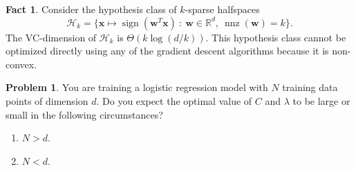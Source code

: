 \documentclass[10pt]{exam}
\theoremstyle{definition}
\newtheorem{problem}{Problem}
\newtheorem{fact}{Fact}
\newcommand{\R}{\mathbb R}
\DeclareMathOperator{\nnz}{nnz}
\DeclareMathOperator{\sign}{sign}
\newcommand{\trans}[1]{{#1}^{T}}
\newcommand{\w}{\mathbf w}
\newcommand{\x}{\mathbf x}
\begin{document}
\vspace{0.2in}
\begin{fact}
    Consider the hypothesis class of $k$-sparse halfspaces
    \begin{equation}
        \mathcal{H}_k = \bigg\{ \x \mapsto \sign(\trans\w\x) ~:~ \w\in\R^d,~\nnz(\w)=k \bigg\}
        .
    \end{equation}
    The VC-dimension of $\mathcal{H}_k$ is $\Theta(k\log (d/k))$.
    This hypothesis class cannot be optimized directly using any of the gradient descent algorithms because it is non-convex.
\end{fact}

\newpage
\begin{problem}
    You are training a logistic regression model with $N$ training data points of dimension $d$.
    Do you expect the optimal value of $C$ and $\lambda$ to be large or small in the following circumstances?
    \begin{enumerate}
        \item $N > d$.
            \vspace{3in}
        \item $N < d$.
    \end{enumerate}
\end{problem}
\end{document}
